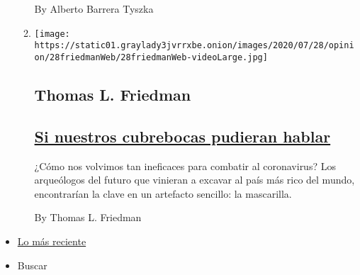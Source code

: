 \begin{enumerate}
\begin{enumerate}
    By Alberto Barrera Tyszka
  \item
    \texttt{[image: https://static01.graylady3jvrrxbe.onion/images/2020/07/28/opinion/28friedmanWeb/28friedmanWeb-videoLarge.jpg]}

    \hypertarget{thomas-l-friedman}{%
    \subsection{Thomas L. Friedman}\label{thomas-l-friedman}}

    \hypertarget{si-nuestros-cubrebocas-pudieran-hablar}{%
    \subsection{\texorpdfstring{\href{/es/2020/07/30/espanol/opinion/usar-cubrebocas-politica.html}{Si
    nuestros cubrebocas pudieran
    hablar}}{Si nuestros cubrebocas pudieran hablar}}\label{si-nuestros-cubrebocas-pudieran-hablar}}

    ¿Cómo nos volvimos tan ineficaces para combatir al coronavirus? Los
    arqueólogos del futuro que vinieran a excavar al país más rico del
    mundo, encontrarían la clave en un artefacto sencillo: la
    mascarilla.

    By Thomas L. Friedman
  \end{enumerate}
\end{enumerate}

\begin{itemize}
\tightlist
\item
  \protect\hyperlink{stream-panel}{Lo más reciente}
\item
  Buscar
\end{itemize}

